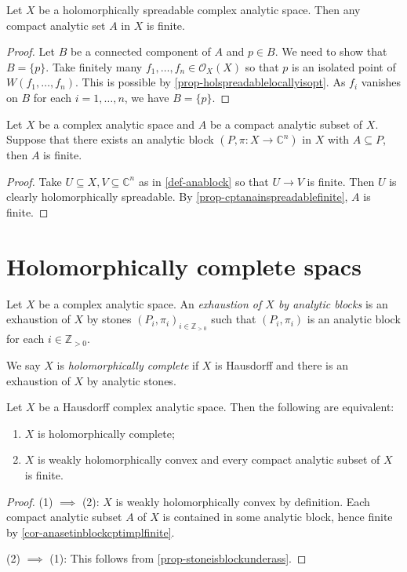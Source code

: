 \begin{proposition}\label{prop-cptanainspreadablefinite}
    Let $X$ be a holomorphically spreadable complex analytic space. Then any compact analytic set $A$ in $X$ is finite.
\end{proposition}
\begin{proof}
    Let $B$ be a connected component of $A$ and $p\in B$. We need to show that $B=\{p\}$. Take finitely many $f_1,\ldots,f_n\in \mathcal{O}_X(X)$ so that $p$ is an isolated point of $W(f_1,\ldots,f_n)$. This is possible by \cref{prop-holspreadablelocallyisopt}.
    As $f_i$ vanishes on $B$ for each $i=1,\ldots,n$, we have $B=\{p\}$.
\end{proof}
\begin{corollary}\label{cor-anasetinblockcptimplfinite}
    Let $X$ be a complex analytic space and $A$ be a compact analytic subset of $X$. Suppose that there exists an analytic block $(P,\pi:X\rightarrow \mathbb{C}^n)$ in $X$ with $A\subseteq P$, then $A$ is finite.
\end{corollary}
\begin{proof}
    Take $U\subseteq X,V\subseteq \mathbb{C}^n$ as in \cref{def-anablock} so that $U\rightarrow V$ is finite. Then $U$ is clearly holomorphically spreadable. By \cref{prop-cptanainspreadablefinite}, $A$ is finite.
\end{proof}

\section{Holomorphically complete spacs}

\begin{definition}
    Let $X$ be a complex analytic space. An \emph{exhaustion of $X$ by analytic blocks} is an exhaustion of $X$ by stones $(P_i,\pi_i)_{i\in \mathbb{Z}_{>0}}$ such that $(P_i,\pi_i)$ is an analytic block for each $i\in \mathbb{Z}_{>0}$.

    We say $X$ is \emph{holomorphically complete} if $X$ is Hausdorff and there is an exhaustion of $X$ by analytic stones.
\end{definition}
\begin{thm}\label{thm-holcomchar}
    Let $X$ be a Hausdorff complex analytic space. Then the following are equivalent:
    \begin{enumerate}
        \item $X$ is holomorphically complete;
        \item $X$ is weakly holomorphically convex and every compact analytic subset of $X$ is finite.
    \end{enumerate}
\end{thm}
\begin{proof}
    (1) $\implies$ (2): $X$ is weakly holomorphically convex by definition. Each compact analytic subset $A$ of $X$ is contained in some analytic block, hence finite by \cref{cor-anasetinblockcptimplfinite}.

    (2) $\implies$ (1): This follows from \cref{prop-stoneisblockunderass}.
\end{proof}

